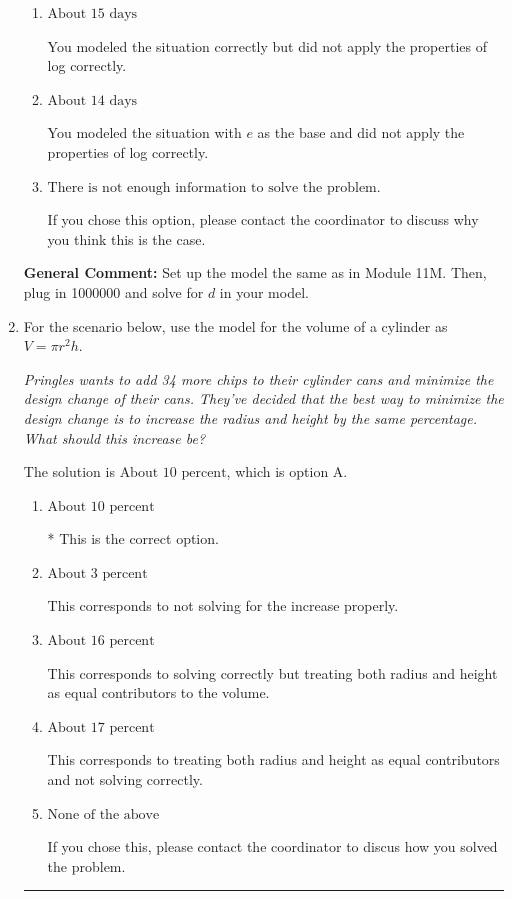 \documentclass{extbook}[14pt]
\newcommand{\litem}[1]{\item #1

\rule{\textwidth}{0.4pt}}
\begin{document}
\begin{enumerate}
{\begin{enumerate}[label=\Alph*.]
* This is the correct option.
\item \( \text{About } 15 \text{ days} \)

You modeled the situation correctly but did not apply the properties of log correctly.
\item \( \text{About } 14 \text{ days} \)

You modeled the situation with $e$ as the base and did not apply the properties of log correctly.
\item \( \text{There is not enough information to solve the problem.} \)

If you chose this option, please contact the coordinator to discuss why you think this is the case.
\end{enumerate}

\textbf{General Comment:} Set up the model the same as in Module 11M. Then, plug in 1000000 and solve for $d$ in your model.
}
\litem{
For the scenario below, use the model for the volume of a cylinder as $V = \pi r^2 h$.

\begin{center}
    \textit{ Pringles wants to add 34 \text{percent} more chips to their cylinder cans and minimize the design change of their cans. They've decided that the best way to minimize the design change is to increase the radius and height by the same percentage. What should this increase be? }
\end{center}
The solution is \( \text{About } 10 \text{ percent} \), which is option A.\begin{enumerate}[label=\Alph*.]
\item \( \text{About } 10 \text{ percent} \)

* This is the correct option.
\item \( \text{About } 3 \text{ percent} \)

This corresponds to not solving for the increase properly.
\item \( \text{About } 16 \text{ percent} \)

This corresponds to solving correctly but treating both radius and height as equal contributors to the volume.
\item \( \text{About } 17 \text{ percent} \)

This corresponds to treating both radius and height as equal contributors and not solving correctly.
\item \( \text{None of the above} \)

If you chose this, please contact the coordinator to discus how you solved the problem.
\end{enumerate}

}
\end{enumerate}
\end{document}

